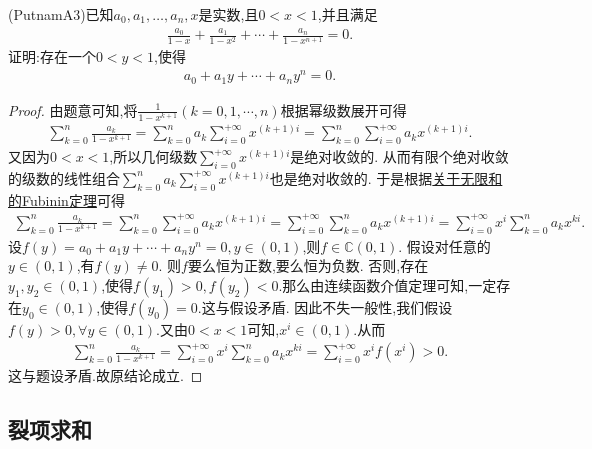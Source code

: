 \documentclass[../../main.tex]{subfiles}%
\begin{document}
\begin{example}
(PutnamA3)已知\(a_0, a_1, \ldots, a_n, x\)是实数,且\(0 < x < 1\),并且满足
\begin{align*}
\frac{a_0}{1 - x}+\frac{a_1}{1 - x^2}+\cdots+\frac{a_n}{1 - x^{n + 1}} = 0.
\nonumber
\end{align*}
证明:存在一个\(0 < y < 1\),使得
\begin{align*}
a_0 + a_1y + \cdots + a_ny^n = 0.
\nonumber
\end{align*}
\end{example}

\begin{proof}

由题意可知,将$\frac{1}{1-x^{k+1}}\left( k=0,1,\cdots ,n \right)$根据幂级数展开可得
\begin{align*}
\sum\limits_{k=0}^n{\frac{a_k}{1-x^{k+1}}}=\sum\limits_{k=0}^n{a_k\sum\limits_{i=0}^{+\infty}{x^{\left( k+1 \right) i}}}=\sum\limits_{k=0}^n{\sum\limits_{i=0}^{+\infty}{a_kx^{\left( k+1 \right) i}}}.
\nonumber
\end{align*}
又因为$0<x<1$,所以几何级数$\sum\limits_{i=0}^{+\infty}{x^{\left( k+1 \right) i}}$是绝对收敛的.
从而有限个绝对收敛的级数的线性组合$\sum\limits_{k=0}^n{a_k\sum\limits_{i=0}^{+\infty}{x^{\left( k+1 \right) i}}}$也是绝对收敛的.
于是根据\hyperlink{关于无限和的Fubinin定理}{关于无限和的Fubinin定理}可得
\begin{align*}
\sum\limits_{k=0}^n{\frac{a_k}{1-x^{k+1}}}=\sum\limits_{k=0}^n{\sum\limits_{i=0}^{+\infty}{a_kx^{\left( k+1 \right) i}}}=\sum\limits_{i=0}^{+\infty}{\sum\limits_{k=0}^n{a_kx^{\left( k+1 \right) i}}}=\sum\limits_{i=0}^{+\infty}{x^i\sum\limits_{k=0}^n{a_kx^{ki}}}.
\nonumber
\end{align*}
设$f(y)=a_0 + a_1y + \cdots + a_ny^n = 0,y\in(0,1)$,则$f\in \mathbb{C}(0,1)$.
假设对任意的$y\in(0,1)$,有$f(y)\ne0$.
则$f$要么恒为正数,要么恒为负数.
否则,存在$y_1,y_2\in(0,1)$,使得$f(y_1)>0,f(y_2)<0$.那么由连续函数介值定理可知,一定存在$y_0\in(0,1)$,使得$f(y_0)=0$.这与假设矛盾.
因此不失一般性,我们假设$f(y)>0,\forall y\in (0,1)$.又由$0<x<1$可知,$x^i\in(0,1)$.从而
\begin{align*}
\sum\limits_{k=0}^n{\frac{a_k}{1-x^{k+1}}}=\sum\limits_{i=0}^{+\infty}{x^i\sum\limits_{k=0}^n{a_kx^{ki}}=}\sum\limits_{i=0}^{+\infty}{x^if\left( x^i \right)}>0.
\nonumber
\end{align*}
这与题设矛盾.故原结论成立.

\end{proof}

\subsection{裂项求和}
\end{document}
